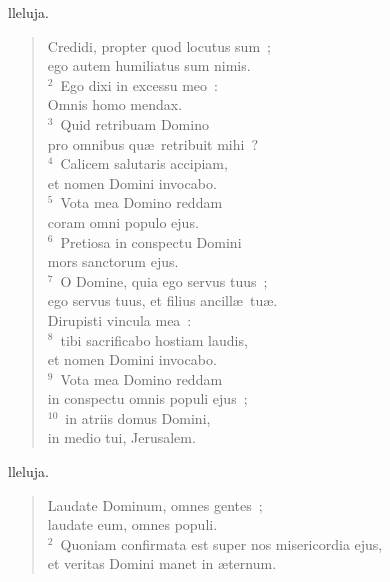 \bchapter
{}lleluja. \begin{flushleft}\begin{verse}\vspace{6pt}Credidi, propter quod locutus sum~;\\ ego autem humiliatus sum nimis.\\
${}^{2}$~Ego dixi in excessu meo~:\\ Omnis homo mendax.\\
${}^{3}$~Quid retribuam Domino\\ pro omnibus qu\ae\ retribuit mihi~?\\
${}^{4}$~Calicem salutaris accipiam,\\ et nomen Domini invocabo.\\
${}^{5}$~Vota mea Domino reddam\\ coram omni populo ejus.\\
${}^{6}$~Pretiosa in conspectu Domini\\ mors sanctorum ejus.\\
${}^{7}$~O Domine, quia ego servus tuus~;\\ ego servus tuus, et filius ancill\ae\ tu\ae .\\ Dirupisti vincula mea~:\\
${}^{8}$~tibi sacrificabo hostiam laudis,\\ et nomen Domini invocabo.\\
${}^{9}$~Vota mea Domino reddam\\ in conspectu omnis populi ejus~;\\
${}^{10}$~in atriis domus Domini,\\ in medio tui, Jerusalem.\end{verse}\end{flushleft}



\bchapter
{}lleluja. \begin{flushleft}\begin{verse}\vspace{6pt}Laudate Dominum, omnes gentes~;\\ laudate eum, omnes populi.\\
${}^{2}$~Quoniam confirmata est super nos misericordia ejus,\\ et veritas Domini manet in \ae ternum.\end{verse}\end{flushleft}



